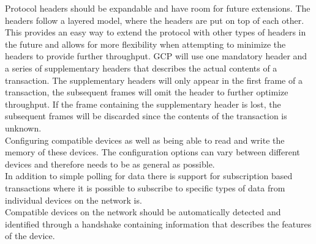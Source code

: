 Protocol headers should be expandable and have room for future extensions. The headers follow a layered model, where the headers are put on top of each other. This provides an easy way to extend the protocol with other types of headers in the future and allows for more flexibility when attempting to minimize the headers to provide further throughput. GCP will use one mandatory header and a series of supplementary headers that describes the actual contents of a transaction. The supplementary headers will only appear in the first frame of a transaction, the subsequent frames will omit the header to further optimize throughput. If the frame containing the supplementary header is lost, the subsequent frames will be discarded since the contents of the transaction is unknown.
\\
Configuring compatible devices as well as being able to read and write the memory of these devices. The configuration options can vary between different devices and therefore needs to be as general as possible.
\\
In addition to simple polling for data there is support for subscription based transactions where it is possible to subscribe to specific types of data from individual devices on the network is.
\\
Compatible devices on the network should be automatically detected and identified through a handshake containing information that describes the features of the device.

